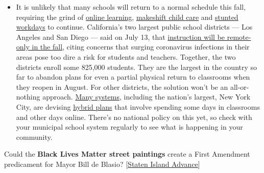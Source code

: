 \begin{itemize}
  \begin{itemize}
  \tightlist
  \item
    It is unlikely that many schools will return to a normal schedule
    this fall, requiring the grind of
    \href{https://www.nytimes3xbfgragh.onion/2020/06/05/us/coronavirus-education-lost-learning.html?action=click\&pgtype=Article\&state=default\&region=MAIN_CONTENT_3\&context=storylines_faq}{online
    learning},
    \href{https://www.nytimes3xbfgragh.onion/2020/05/29/us/coronavirus-child-care-centers.html?action=click\&pgtype=Article\&state=default\&region=MAIN_CONTENT_3\&context=storylines_faq}{makeshift
    child care} and
    \href{https://www.nytimes3xbfgragh.onion/2020/06/03/business/economy/coronavirus-working-women.html?action=click\&pgtype=Article\&state=default\&region=MAIN_CONTENT_3\&context=storylines_faq}{stunted
    workdays} to continue. California's two largest public school
    districts --- Los Angeles and San Diego --- said on July 13, that
    \href{https://www.nytimes3xbfgragh.onion/2020/07/13/us/lausd-san-diego-school-reopening.html?action=click\&pgtype=Article\&state=default\&region=MAIN_CONTENT_3\&context=storylines_faq}{instruction
    will be remote-only in the fall}, citing concerns that surging
    coronavirus infections in their areas pose too dire a risk for
    students and teachers. Together, the two districts enroll some
    825,000 students. They are the largest in the country so far to
    abandon plans for even a partial physical return to classrooms when
    they reopen in August. For other districts, the solution won't be an
    all-or-nothing approach.
    \href{https://bioethics.jhu.edu/research-and-outreach/projects/eschool-initiative/school-policy-tracker/}{Many
    systems}, including the nation's largest, New York City, are
    devising
    \href{https://www.nytimes3xbfgragh.onion/2020/06/26/us/coronavirus-schools-reopen-fall.html?action=click\&pgtype=Article\&state=default\&region=MAIN_CONTENT_3\&context=storylines_faq}{hybrid
    plans} that involve spending some days in classrooms and other days
    online. There's no national policy on this yet, so check with your
    municipal school system regularly to see what is happening in your
    community.
  \end{itemize}
\end{itemize}

Could the \textbf{Black Lives Matter street paintings} create a First
Amendment predicament for Mayor Bill de Blasio?
{[}\href{https://www.silive.com/news/2020/08/street-murals-may-create-a-first-amendment-predicament-for-de-blasio.html}{Staten
Island Advance}{]}

